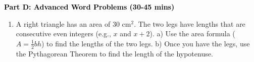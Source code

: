 \documentclass[12pt, letterpaper, fleqn]{article}
\begin{document}
\newpage

\begin{tcolorbox}[colback=customteal!20]
\large\textcolor{black}{\textbf{Part D: Advanced Word Problems (30-45 mins)}}
\end{tcolorbox}

\vspace{3mm}

\begin{enumerate}[itemsep=5.5cm, leftmargin=0.6cm, resume]
\item A right triangle has an area of $30\text{ cm}^2$. The two legs have lengths that are consecutive even integers (e.g., $x$ and $x+2$). 
a) Use the area formula ($A = \frac{1}{2}bh$) to find the lengths of the two legs.
b) Once you have the legs, use the Pythagorean Theorem to find the length of the hypotenuse.
\end{enumerate}
\end{document}
